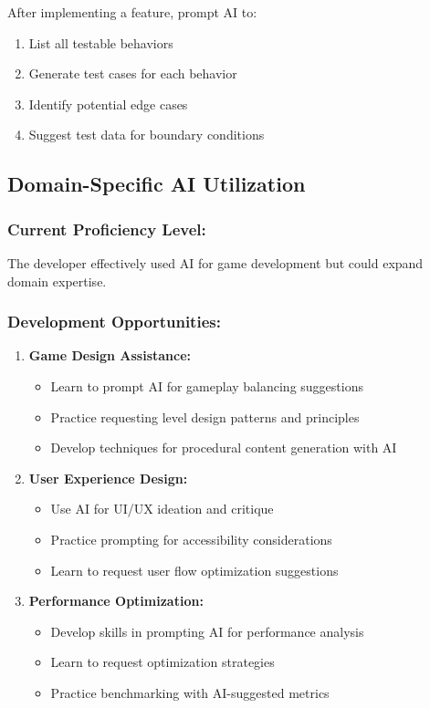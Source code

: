 \documentclass[12pt,a4paper]{article}
\begin{document}
After implementing a feature, prompt AI to:
\begin{enumerate}
    \item List all testable behaviors
    \item Generate test cases for each behavior
    \item Identify potential edge cases
    \item Suggest test data for boundary conditions
\end{enumerate}

\subsection{Domain-Specific AI Utilization}

\subsubsection*{Current Proficiency Level:}
The developer effectively used AI for game development but could expand domain expertise.

\subsubsection*{Development Opportunities:}

\begin{enumerate}
    \item \textbf{Game Design Assistance:}
    \begin{itemize}
        \item Learn to prompt AI for gameplay balancing suggestions
        \item Practice requesting level design patterns and principles
        \item Develop techniques for procedural content generation with AI
    \end{itemize}
    
    \item \textbf{User Experience Design:}
    \begin{itemize}
        \item Use AI for UI/UX ideation and critique
        \item Practice prompting for accessibility considerations
        \item Learn to request user flow optimization suggestions
    \end{itemize}
    
    \item \textbf{Performance Optimization:}
    \begin{itemize}
        \item Develop skills in prompting AI for performance analysis
        \item Learn to request optimization strategies
        \item Practice benchmarking with AI-suggested metrics
    \end{itemize}
\end{enumerate}
\end{document}
